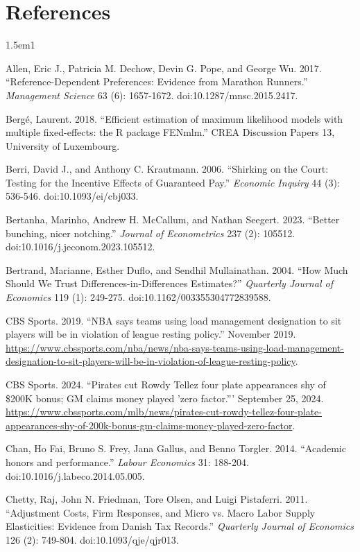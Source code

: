 \documentclass[11pt]{article}
\begin{document}
\clearpage
\section*{References}
\begingroup\sloppy\small
\begin{hangparas}{1.5em}{1}

Allen, Eric J., Patricia M. Dechow, Devin G. Pope, and George Wu. 2017. ``Reference-Dependent Preferences: Evidence from Marathon Runners.'' \emph{Management Science} 63 (6): 1657-1672. doi:10.1287/mnsc.2015.2417.

Bergé, Laurent. 2018. ``Efficient estimation of maximum likelihood models with multiple fixed-effects: the R package FENmlm.'' CREA Discussion Papers 13, University of Luxembourg.

Berri, David J., and Anthony C. Krautmann. 2006. ``Shirking on the Court: Testing for the Incentive Effects of Guaranteed Pay.'' \emph{Economic Inquiry} 44 (3): 536-546. doi:10.1093/ei/cbj033.

Bertanha, Marinho, Andrew H. McCallum, and Nathan Seegert. 2023. ``Better bunching, nicer notching.'' \emph{Journal of Econometrics} 237 (2): 105512. doi:10.1016/j.jeconom.2023.105512.

Bertrand, Marianne, Esther Duflo, and Sendhil Mullainathan. 2004. ``How Much Should We Trust Differences-in-Differences Estimates?'' \emph{Quarterly Journal of Economics} 119 (1): 249-275. doi:10.1162/003355304772839588.

CBS Sports. 2019. ``NBA says teams using load management designation to sit players will be in violation of league resting policy.'' November 2019. \url{https://www.cbssports.com/nba/news/nba-says-teams-using-load-management-designation-to-sit-players-will-be-in-violation-of-league-resting-policy}.

CBS Sports. 2024. ``Pirates cut Rowdy Tellez four plate appearances shy of \$200K bonus; GM claims money played 'zero factor.''' September 25, 2024. \url{https://www.cbssports.com/mlb/news/pirates-cut-rowdy-tellez-four-plate-appearances-shy-of-200k-bonus-gm-claims-money-played-zero-factor}.

Chan, Ho Fai, Bruno S. Frey, Jana Gallus, and Benno Torgler. 2014. ``Academic honors and performance.'' \emph{Labour Economics} 31: 188-204. doi:10.1016/j.labeco.2014.05.005.

Chetty, Raj, John N. Friedman, Tore Olsen, and Luigi Pistaferri. 2011. ``Adjustment Costs, Firm Responses, and Micro vs. Macro Labor Supply Elasticities: Evidence from Danish Tax Records.'' \emph{Quarterly Journal of Economics} 126 (2): 749-804. doi:10.1093/qje/qjr013.


\end{hangparas}
\end{document}
